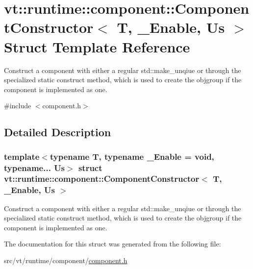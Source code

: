 \hypertarget{structvt_1_1runtime_1_1component_1_1_component_constructor}{}\section{vt\+:\+:runtime\+:\+:component\+:\+:Component\+Constructor$<$ T, \+\_\+\+Enable, Us $>$ Struct Template Reference}
\label{structvt_1_1runtime_1_1component_1_1_component_constructor}


Construct a component with either a regular {\ttfamily std\+::make\+\_\+unqiue} or through the specialized static {\ttfamily construct} method, which is used to create the objgroup if the component is implemented as one.  




{\ttfamily \#include $<$component.\+h$>$}



\subsection{Detailed Description}
\subsubsection*{template$<$typename T, typename \+\_\+\+Enable = void, typename... Us$>$\newline
struct vt\+::runtime\+::component\+::\+Component\+Constructor$<$ T, \+\_\+\+Enable, Us $>$}

Construct a component with either a regular {\ttfamily std\+::make\+\_\+unqiue} or through the specialized static {\ttfamily construct} method, which is used to create the objgroup if the component is implemented as one. 

The documentation for this struct was generated from the following file\+:\begin{DoxyCompactItemize}
\item 
src/vt/runtime/component/\hyperlink{component_8h}{component.\+h}\end{DoxyCompactItemize}
